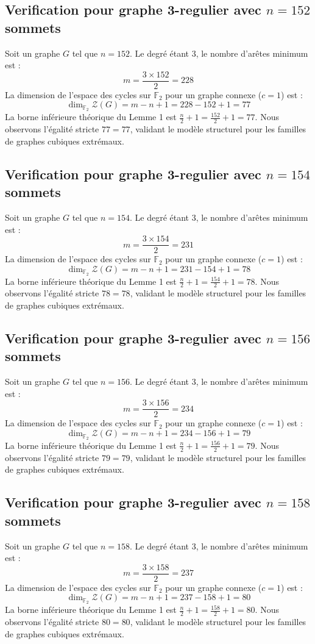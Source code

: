 \documentclass[11pt,a4paper]{article}
\begin{document}
\subsection{Verification pour graphe 3-regulier avec $n=152$ sommets}
Soit un graphe $G$ tel que $n = 152$. Le degré étant 3, le nombre d'arêtes minimum est :
$$ m = \frac{3 \times 152}{2} = 228 $$
La dimension de l'espace des cycles sur $\mathbb{F}_2$ pour un graphe connexe ($c=1$) est :
$$ \dim_{\mathbb{F}_2} \mathcal{Z}(G) = m - n + 1 = 228 - 152 + 1 = 77 $$
La borne inférieure théorique du Lemme 1 est $\frac{n}{2} + 1 = \frac{152}{2} + 1 = 77$.
Nous observons l'égalité stricte $77 = 77$, validant le modèle structurel pour les familles de graphes cubiques extrémaux.

\subsection{Verification pour graphe 3-regulier avec $n=154$ sommets}
Soit un graphe $G$ tel que $n = 154$. Le degré étant 3, le nombre d'arêtes minimum est :
$$ m = \frac{3 \times 154}{2} = 231 $$
La dimension de l'espace des cycles sur $\mathbb{F}_2$ pour un graphe connexe ($c=1$) est :
$$ \dim_{\mathbb{F}_2} \mathcal{Z}(G) = m - n + 1 = 231 - 154 + 1 = 78 $$
La borne inférieure théorique du Lemme 1 est $\frac{n}{2} + 1 = \frac{154}{2} + 1 = 78$.
Nous observons l'égalité stricte $78 = 78$, validant le modèle structurel pour les familles de graphes cubiques extrémaux.

\subsection{Verification pour graphe 3-regulier avec $n=156$ sommets}
Soit un graphe $G$ tel que $n = 156$. Le degré étant 3, le nombre d'arêtes minimum est :
$$ m = \frac{3 \times 156}{2} = 234 $$
La dimension de l'espace des cycles sur $\mathbb{F}_2$ pour un graphe connexe ($c=1$) est :
$$ \dim_{\mathbb{F}_2} \mathcal{Z}(G) = m - n + 1 = 234 - 156 + 1 = 79 $$
La borne inférieure théorique du Lemme 1 est $\frac{n}{2} + 1 = \frac{156}{2} + 1 = 79$.
Nous observons l'égalité stricte $79 = 79$, validant le modèle structurel pour les familles de graphes cubiques extrémaux.

\subsection{Verification pour graphe 3-regulier avec $n=158$ sommets}
Soit un graphe $G$ tel que $n = 158$. Le degré étant 3, le nombre d'arêtes minimum est :
$$ m = \frac{3 \times 158}{2} = 237 $$
La dimension de l'espace des cycles sur $\mathbb{F}_2$ pour un graphe connexe ($c=1$) est :
$$ \dim_{\mathbb{F}_2} \mathcal{Z}(G) = m - n + 1 = 237 - 158 + 1 = 80 $$
La borne inférieure théorique du Lemme 1 est $\frac{n}{2} + 1 = \frac{158}{2} + 1 = 80$.
Nous observons l'égalité stricte $80 = 80$, validant le modèle structurel pour les familles de graphes cubiques extrémaux.
\end{document}
